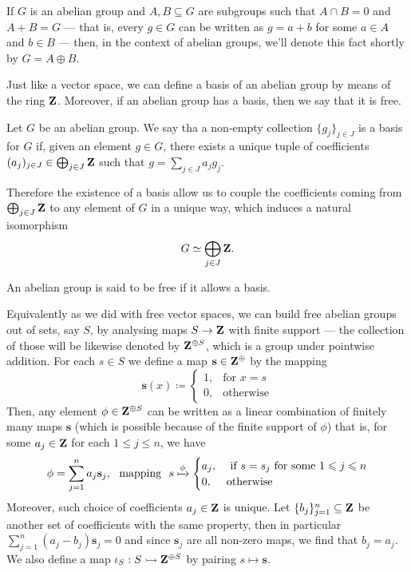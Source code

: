 If \(G\) is an abelian group and \(A, B \subseteq G\) are subgroups such that
\(A \cap B = 0\) and \(A + B = G\) --- that is, every \(g \in G\) can be
written as \(g = a + b\) for some \(a \in A\) and \(b \in B\) --- then, in the
context of abelian groups, we'll denote this fact shortly by \(G = A \oplus B\).

Just like a vector space, we can define a basis of an abelian group by means of
the ring \(\Z\). Moreover, if an abelian group has a basis, then we say that it
is free.

\begin{definition}[Basis]
\label{def:Ab-basis}
Let \(G\) be an abelian group. We say tha a non-empty collection
\(\{g_j\}_{j \in J}\) is a basis for \(G\) if, given an element \(g \in G\),
there exists a unique tuple of coefficients
\((a_j)_{j \in J} \in \bigoplus_{j \in J} \Z\) such that
\(g = \sum_{j \in J} a_j g_j\).
\end{definition}

Therefore the existence of a basis allow us to couple the coefficients coming
from \(\bigoplus_{j \in J} \Z\) to any element of \(G\) in a unique way, which
induces a natural isomorphism
\[
  G \iso \bigoplus_{j \in J} \Z.
\]

\begin{definition}\label{def:Ab-free}
An abelian group is said to be free if it allows a basis.
\end{definition}

Equivalently as we did with free vector spaces, we can build free abelian groups
out of sets, say \(S\), by analysing maps \(S \to \Z\) with finite support ---
the collection of those will be likewise denoted by \(\Z^{\oplus S}\), which is
a group under pointwise addition. For each \(s \in S\) we define a map
\(\mathbf{s} \in \Z^{\oplus}\) by the mapping
\[
  \mathbf{s}(x) \coloneq
  \begin{cases}
    1, &\text{for } x = s \\
    0, &\text{otherwise}
  \end{cases}
\]
Then, any element \(\phi \in \Z^{\oplus S}\) can be written as a linear
combination of finitely many maps \(\mathbf{s}\) (which is possible because of
the finite support of \(\phi\)) that is, for some \(a_j \in \Z\) for each
\(1 \leq j \leq n\), we have
\[
  \phi = \sum_{j=1}^n a_j \mathbf{s}_j,\ \text{ mapping }\
  s \xmapsto \phi
  \begin{cases}
    a_j, &\text{ if } s = s_j \text{ for some } 1 \leq j \leq n \\
    0, &\text{otherwise}
  \end{cases}
\]
Moreover, such choice of coefficients \(a_j \in \Z\) is unique. Let
\(\{b_{j}\}_{j=1}^n \subseteq \Z\) be another set of coefficients with the same
property, then in particular \(\sum_{j=1}^n (a_j - b_j) \mathbf{s}_j = 0\) and
since \(\mathbf{s}_j\) are all non-zero maps, we find that \(b_j = a_j\). We
also define a map \(\iota_S: S \mono \Z^{\oplus S}\) by pairing
\(s \mapsto \mathbf{s}\).

